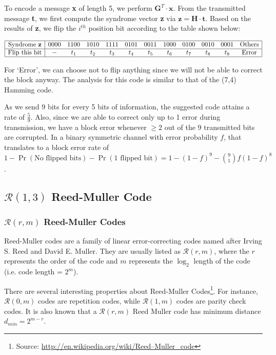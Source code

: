 \documentclass[12pt, a4paper]{article}
\begin{document}
To encode a message \textbf{x} of length 5, we perform $\textbf{G}^T \cdot \textbf{x}$. From the transmitted message \textbf{t}, we first compute the syndrome vector \textbf{z} via $\textbf{z} = \textbf{H} \cdot \textbf{t}$. Based on the results of \textbf{z}, we flip the $i^{th}$ position bit according to the table shown below:

$$
\begin{array}{|c|ccccccccccc|}
\hline
\text{Syndrome \textbf{z}} 	& 0000 & 1100 & 1010 & 1111 & 0101 & 0011 & 1000 & 0100 & 0010 & 0001 & \text{Others}\\
\hline
\text{Flip this bit} 		&  -  & t_1 & t_2 & t_3 & t_4 & t_5 & t_6 & t_7 & t_8 & t_9 & \text{Error}\\
\hline
\end{array}
$$

For `Error', we can choose not to flip anything since we will not be able to correct the block anyway. The analysis for this code is similar to that of the (7,4) Hamming code.

As we send 9 bits for every 5 bits of information, the suggested code attains a rate of $\frac{5}{9}$. Also, since we are able to correct only up to 1 error during transmission, we have a block error whenever $\geq 2$ out of the 9 transmitted bits are corrupted. In a binary symmetric channel with error probability $f$, that translates to a block error rate of $1 - \Pr(\text{No flipped bits}) - \Pr(\text{1 flipped bit}) = 1 - (1-f)^9 - \binom{9}{1}f(1-f)^8$.

\subsection{$\mathcal{R}(1,3)$ Reed-Muller Code}
\subsubsection{$\mathcal{R}(r,m)$ Reed-Muller Codes}
Reed-Muller codes are a family of linear error-correcting codes named after Irving S. Reed and David E. Muller. They are usually listed as $\mathcal{R}(r,m)$, where the $r$ represents the order of the code and $m$ represents the $\log_2$ length of the code (i.e. code length = $2^m$).

There are several interesting properties about Reed-Muller Codes\footnote{Source: \url{http://en.wikipedia.org/wiki/Reed–Muller_code}}. For instance, $\mathcal{R}(0,m)$ codes are repetition codes, while $\mathcal{R}(1,m)$ codes are parity check codes. It is also known that a $\mathcal{R}(r,m)$ Reed Muller code has minimum distance $d_{min} = 2^{m-r}$.
\end{document}
